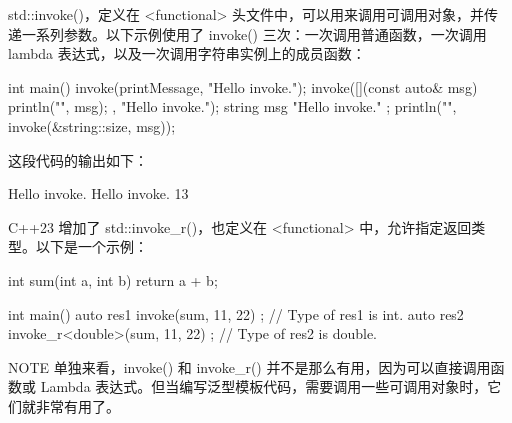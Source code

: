 
std::invoke()，定义在 <functional> 头文件中，可以用来调用可调用对象，并传递一系列参数。以下示例使用了 invoke() 三次：一次调用普通函数，一次调用 lambda 表达式，以及一次调用字符串实例上的成员函数：

\begin{cpp}
int main()
{
    invoke(printMessage, "Hello invoke.");
    invoke([](const auto& msg) { println("{}", msg); }, "Hello invoke.");
    string msg { "Hello invoke." };
    println("{}", invoke(&string::size, msg));
}
\end{cpp}

这段代码的输出如下：

\begin{shell}
Hello invoke.
Hello invoke.
13
\end{shell}


C++23 增加了 std::invoke\_r()，也定义在 <functional> 中，允许指定返回类型。以下是一个示例：

\begin{cpp}
int sum(int a, int b) { return a + b; }

int main()
{
    auto res1 { invoke(sum, 11, 22) }; // Type of res1 is int.
    auto res2 { invoke_r<double>(sum, 11, 22) }; // Type of res2 is double.
}
\end{cpp}

\begin{myNotic}{NOTE}
单独来看，invoke() 和 invoke\_r() 并不是那么有用，因为可以直接调用函数或 Lambda 表达式。但当编写泛型模板代码，需要调用一些可调用对象时，它们就非常有用了。
\end{myNotic}







